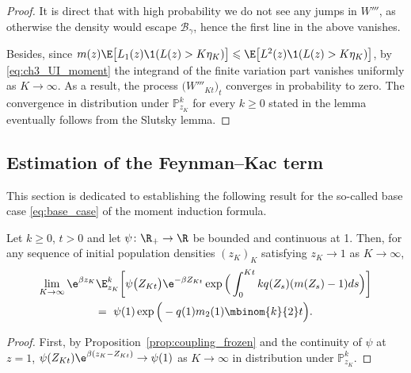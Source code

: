 \begin{refsegment}
\begin{proof}
It is direct that with high probability we do not see any jumps in $W'''$, as otherwise the density would escape $\mathscr{B}_{\gamma}$, hence the first line in the above vanishes. 

Besides, since $m(z) \E\big[ L_1(z)\1(L(z)> K \eta_K)\big] \leqslant
\E\big[ L^2(z)\1(L(z)> K \eta_K)\big]$, by \eqref{eq:ch3_UI_moment} the
integrand of the finite variation part vanishes uniformly as $K\to\infty$. As a result, the process $\big(W'''_{Kt}\big)_t$ converges in probability to zero. The convergence in distribution under $\mathbb{P}^k_{z_K}$ for every $k\geqslant 0$ stated in the lemma eventually follows from the Slutsky lemma.
\end{proof}


\subsection{Estimation of the Feynman--Kac term}

This section is dedicated to establishing the following result for the
so-called base case \eqref{eq:base_case} of the moment induction formula.

\begin{prop}\label{prop:estimation_deltak_multitype}
Let $k\geqslant 0$, $t>0$ and let $\psi \colon \R_+ \to \R$ be bounded and
continuous at 1. Then, for any sequence of initial population densities $(z_K)_K$ satisfying
$z_K\to 1$ as $K\to\infty$,
\begin{multline*}
    \lim_{K\to\infty} \e^{\beta z_K}\E^k_{z_K}\bigg[\psi\big( Z_{Kt}\big) \e^{-\beta Z_{Kt}} \exp\Big(\int_0^{Kt}  k q({Z}_s)({m}({Z}_s)-1)ds\Big)\bigg]\\ =\ \psi(1)\exp\Big(-q(1)m_2(1)\mbinom{k}{2}t\Big).
\end{multline*}

\end{prop}

\begin{proof}

First, by Proposition~\ref{prop:coupling_frozen} and the continuity of
$\psi$ at $z=1$, $\psi( Z_{Kt})\e^{\beta(z_K -Z_{Kt})} \to \psi(1)$
as $K \to \infty$ in distribution under $\mathbb{P}^k_{z_K}$.


\end{proof}
\end{refsegment}
